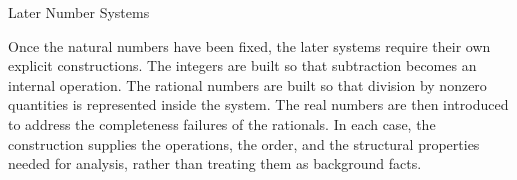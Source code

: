 \begin{topicbox}{Later Number Systems}
\begin{exposition}
Once the natural numbers have been fixed, the later systems require their own
explicit constructions. The integers are built so that subtraction becomes an
internal operation. The rational numbers are built so that division by
nonzero quantities is represented inside the system. The real numbers are
then introduced to address the completeness failures of the rationals. In
each case, the construction supplies the operations, the order, and the
structural properties needed for analysis, rather than treating them as
background facts.
\end{exposition}
\end{topicbox}
